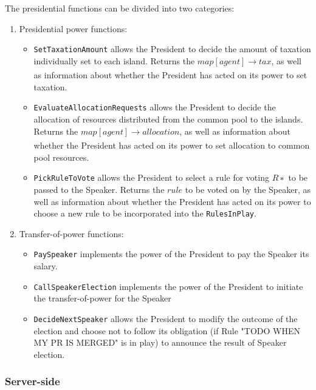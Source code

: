 The presidential functions can be divided into two categories:
\begin{enumerate}
\item Presidential power functions:
    \begin{itemize}
        \item \texttt{SetTaxationAmount} allows the President to decide the amount of taxation individually set to each island. Returns the $map[agent] \xrightarrow[]{} tax$, as well as information about whether the President has acted on its power to set taxation.
        \item \texttt{EvaluateAllocationRequests} allows the President to decide the allocation of resources distributed from the common pool to the islands. Returns the $map[agent] \xrightarrow[]{} allocation$, as well as information about whether the President has acted on its power to set allocation to common pool resources.
        \item \texttt{PickRuleToVote} allows the President to select a rule for voting $R∗$ to be passed to the Speaker. Returns the $rule$ to be voted on by the Speaker, as well as information about whether the President has acted on its power to choose a new rule to be incorporated into the \texttt{RulesInPlay}.
    \end{itemize}
\item Transfer-of-power functions:
    \begin{itemize}
        \item \texttt{PaySpeaker} implements the power of the President to pay the Speaker its salary. 
        \item \texttt{CallSpeakerElection} implements the power of the President to initiate the transfer-of-power for the Speaker
        \item \texttt{DecideNextSpeaker} allows the President to modify the outcome of the election and choose not to follow its obligation (if Rule "TODO WHEN MY PR IS MERGED" is in play) to announce the result of Speaker election.
    \end{itemize}
\end{enumerate}

\subsubsection{Server-side}
\label{sub:president:server-side}


